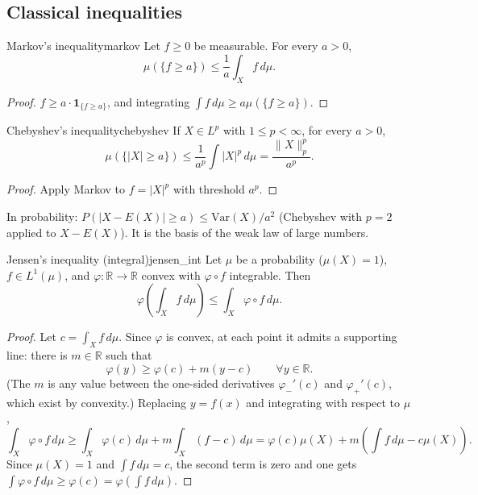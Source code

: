 \documentclass[11pt, a4paper]{article}
\begin{document}
\subsection{Classical inequalities}

\begin{teorema}{Markov's inequality}{markov}
Let $f \ge 0$ be measurable. For every $a > 0$,
$$ \mu(\{f \ge a\}) \le \frac{1}{a} \int_X f \, d\mu. $$
\end{teorema}

\begin{proof}
$f \ge a \cdot \mathbf{1}_{\{f \ge a\}}$, and integrating $\int f \, d\mu \ge a \mu(\{f \ge a\})$.
\end{proof}

\begin{corolario}{Chebyshev's inequality}{chebyshev}
If $X \in L^p$ with $1 \le p < \infty$, for every $a > 0$,
$$ \mu(\{|X| \ge a\}) \le \frac{1}{a^p} \int |X|^p \, d\mu = \frac{\|X\|_p^p}{a^p}. $$
\end{corolario}

\begin{proof}
Apply Markov to $f = |X|^p$ with threshold $a^p$.
\end{proof}

\obs In probability: $P(|X - E(X)| \ge a) \le \mathrm{Var}(X) / a^2$ (Chebyshev with $p = 2$
applied to $X - E(X)$). It is the basis of the weak law of large numbers.

\begin{teorema}{Jensen's inequality (integral)}{jensen_int}
Let $\mu$ be a probability ($\mu(X) = 1$), $f \in L^1(\mu)$, and $\varphi: \mathbb{R} \to \mathbb{R}$
convex with $\varphi \circ f$ integrable. Then
$$ \varphi\!\left(\int_X f \, d\mu\right) \le \int_X \varphi \circ f \, d\mu. $$
\end{teorema}

\begin{proof}
Let $c = \int_X f \, d\mu$. Since $\varphi$ is convex, at each point it admits a supporting line:
there is $m \in \mathbb{R}$ such that
$$ \varphi(y) \ge \varphi(c) + m (y - c) \qquad \forall y \in \mathbb{R}. $$
(The $m$ is any value between the one-sided derivatives $\varphi_-'(c)$ and $\varphi_+'(c)$, which
exist by convexity.) Replacing $y = f(x)$ and integrating with respect to $\mu$,
$$ \int_X \varphi \circ f \, d\mu \ge \int_X \varphi(c) \, d\mu + m \int_X (f - c) \, d\mu
= \varphi(c) \mu(X) + m \left(\int f \, d\mu - c \mu(X)\right). $$
Since $\mu(X) = 1$ and $\int f \, d\mu = c$, the second term is zero and one gets
$\int \varphi \circ f \, d\mu \ge \varphi(c) = \varphi(\int f \, d\mu)$.
\end{proof}
\end{document}
